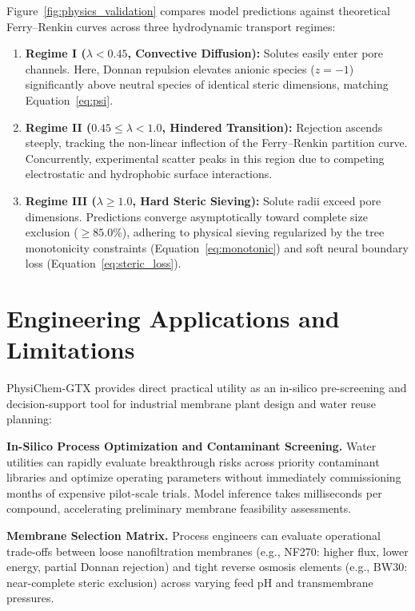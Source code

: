 \documentclass[11pt]{article}
\begin{document}
Figure~\ref{fig:physics_validation} compares model predictions against theoretical Ferry--Renkin curves across three hydrodynamic transport regimes:
\begin{enumerate}[leftmargin=1.2em,itemsep=2pt]
\item \textbf{Regime I ($\lambda < 0.45$, Convective Diffusion):} Solutes easily enter pore channels. Here, Donnan repulsion elevates anionic species ($z=-1$) significantly above neutral species of identical steric dimensions, matching Equation~\ref{eq:psi}.
\item \textbf{Regime II ($0.45 \leq \lambda < 1.0$, Hindered Transition):} Rejection ascends steeply, tracking the non-linear inflection of the Ferry--Renkin partition curve. Concurrently, experimental scatter peaks in this region due to competing electrostatic and hydrophobic surface interactions.
\item \textbf{Regime III ($\lambda \geq 1.0$, Hard Steric Sieving):} Solute radii exceed pore dimensions. Predictions converge asymptotically toward complete size exclusion ($\ge 85.0\%$), adhering to physical sieving regularized by the tree monotonicity constraints (Equation~\ref{eq:monotonic}) and soft neural boundary loss (Equation~\ref{eq:steric_loss}).
\end{enumerate}

\section{Engineering Applications and Limitations}
\label{sec:implications}

PhysiChem-GTX provides direct practical utility as an in-silico pre-screening and decision-support tool for industrial membrane plant design and water reuse planning:

\textbf{In-Silico Process Optimization and Contaminant Screening.} Water utilities can rapidly evaluate breakthrough risks across priority contaminant libraries and optimize operating parameters without immediately commissioning months of expensive pilot-scale trials. Model inference takes milliseconds per compound, accelerating preliminary membrane feasibility assessments.

\textbf{Membrane Selection Matrix.} Process engineers can evaluate operational trade-offs between loose nanofiltration membranes (e.g., NF270: higher flux, lower energy, partial Donnan rejection) and tight reverse osmosis elements (e.g., BW30: near-complete steric exclusion) across varying feed pH and transmembrane pressures.
\end{document}
